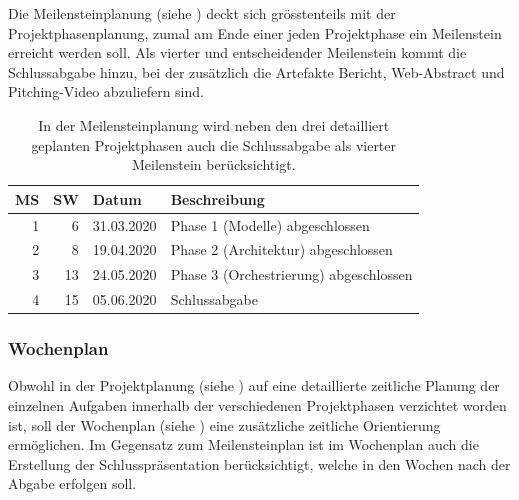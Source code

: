 Die Meilensteinplanung (siehe ) deckt sich grösstenteils mit der Projektphasenplanung, zumal am Ende einer jeden Projektphase ein Meilenstein erreicht werden soll. Als vierter und entscheidender Meilenstein kommt die Schlussabgabe hinzu, bei der zusätzlich die Artefakte Bericht, Web-Abstract und Pitching-Video abzuliefern sind.

\begin{table}[tbh]
    \center
    \small{
        \begin{tabular}{r|r|l|l}
            MS & SW & Datum & Beschreibung \\ \hline
            1 & 6 & 31.03.2020 & Phase 1 (Modelle) abgeschlossen \\
            2 & 8 & 19.04.2020 & Phase 2 (Architektur) abgeschlossen \\
            3 & 13 & 24.05.2020 & Phase 3 (Orchestrierung) abgeschlossen \\
            4 & 15 & 05.06.2020 & Schlussabgabe \\
        \end{tabular}
    }
    \caption{In der Meilensteinplanung wird neben den drei detailliert geplanten Projektphasen auch die Schlussabgabe als vierter Meilenstein berücksichtigt.}
    \label{tbl:meilensteinplanung}
\end{table}

\subsubsection{Wochenplan}

Obwohl in der Projektplanung (siehe ) auf eine detaillierte zeitliche Planung der einzelnen Aufgaben innerhalb der verschiedenen Projektphasen verzichtet worden ist, soll der Wochenplan (siehe ) eine zusätzliche zeitliche Orientierung ermöglichen. Im Gegensatz zum Meilensteinplan ist im Wochenplan auch die Erstellung der Schlusspräsentation berücksichtigt, welche in den Wochen nach der Abgabe erfolgen soll.

